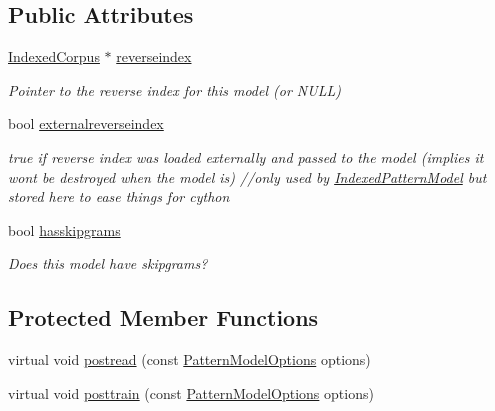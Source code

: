 \subsection*{Public Attributes}
\begin{DoxyCompactItemize}
\item 
\hyperlink{classIndexedCorpus}{Indexed\+Corpus} $\ast$ \hyperlink{classPatternModel_a17ad27133991f964ccd23bb09bf64e5a}{reverseindex}
\begin{DoxyCompactList}\small\item\em Pointer to the reverse index for this model (or N\+U\+L\+L) \end{DoxyCompactList}\item 
bool \hyperlink{classPatternModel_a2f1b4eec80a00ef9c6effea477cc98f4}{externalreverseindex}
\begin{DoxyCompactList}\small\item\em true if reverse index was loaded externally and passed to the model (implies it won\textquotesingle{}t be destroyed when the model is) //only used by \hyperlink{classIndexedPatternModel}{Indexed\+Pattern\+Model} but stored here to ease things for cython \end{DoxyCompactList}\item 
bool \hyperlink{classPatternModel_a9534e66035de7df26c9cd257e2faf7d1}{hasskipgrams}
\begin{DoxyCompactList}\small\item\em Does this model have skipgrams? \end{DoxyCompactList}\end{DoxyCompactItemize}
\subsection*{Protected Member Functions}
\begin{DoxyCompactItemize}
\item 
virtual void \hyperlink{classPatternModel_a3746e351f393bb6201f3b8df92881bb7}{postread} (const \hyperlink{classPatternModelOptions}{Pattern\+Model\+Options} options)
\item 
virtual void \hyperlink{classPatternModel_a5447228ff966dcb3c93c8c787ce31386}{posttrain} (const \hyperlink{classPatternModelOptions}{Pattern\+Model\+Options} options)
\end{DoxyCompactItemize}
